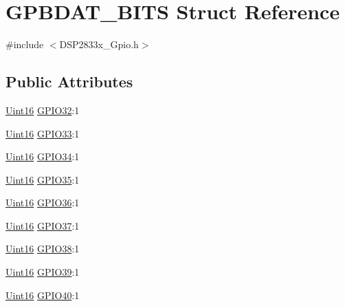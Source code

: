 \hypertarget{struct_g_p_b_d_a_t___b_i_t_s}{}\section{G\+P\+B\+D\+A\+T\+\_\+\+B\+I\+T\+S Struct Reference}
\label{struct_g_p_b_d_a_t___b_i_t_s}


{\ttfamily \#include $<$D\+S\+P2833x\+\_\+\+Gpio.\+h$>$}

\subsection*{Public Attributes}
\begin{DoxyCompactItemize}
\item 
\hyperlink{_d_s_p2833x___device_8h_a59a9f6be4562c327cbfb4f7e8e18f08b}{Uint16} \hyperlink{struct_g_p_b_d_a_t___b_i_t_s_a981125143e66de959da1abfd017fc312}{G\+P\+I\+O32}\+:1
\item 
\hyperlink{_d_s_p2833x___device_8h_a59a9f6be4562c327cbfb4f7e8e18f08b}{Uint16} \hyperlink{struct_g_p_b_d_a_t___b_i_t_s_a111131d857008ac74381f5df451e4d5e}{G\+P\+I\+O33}\+:1
\item 
\hyperlink{_d_s_p2833x___device_8h_a59a9f6be4562c327cbfb4f7e8e18f08b}{Uint16} \hyperlink{struct_g_p_b_d_a_t___b_i_t_s_ab83ff2fae58e99199de5c11d6d023df1}{G\+P\+I\+O34}\+:1
\item 
\hyperlink{_d_s_p2833x___device_8h_a59a9f6be4562c327cbfb4f7e8e18f08b}{Uint16} \hyperlink{struct_g_p_b_d_a_t___b_i_t_s_afb7dceb60d7307dc7c5b00c1e73caf30}{G\+P\+I\+O35}\+:1
\item 
\hyperlink{_d_s_p2833x___device_8h_a59a9f6be4562c327cbfb4f7e8e18f08b}{Uint16} \hyperlink{struct_g_p_b_d_a_t___b_i_t_s_aebb82f21e819b0e764b5ad19af88bd4a}{G\+P\+I\+O36}\+:1
\item 
\hyperlink{_d_s_p2833x___device_8h_a59a9f6be4562c327cbfb4f7e8e18f08b}{Uint16} \hyperlink{struct_g_p_b_d_a_t___b_i_t_s_aa1befdf28c641d439f64b45a02df65d8}{G\+P\+I\+O37}\+:1
\item 
\hyperlink{_d_s_p2833x___device_8h_a59a9f6be4562c327cbfb4f7e8e18f08b}{Uint16} \hyperlink{struct_g_p_b_d_a_t___b_i_t_s_a4e934b93cd175ac43d0ae09c51cff1e8}{G\+P\+I\+O38}\+:1
\item 
\hyperlink{_d_s_p2833x___device_8h_a59a9f6be4562c327cbfb4f7e8e18f08b}{Uint16} \hyperlink{struct_g_p_b_d_a_t___b_i_t_s_a76bbad5b5cf23725ce2968c9ffff75b6}{G\+P\+I\+O39}\+:1
\item 
\hyperlink{_d_s_p2833x___device_8h_a59a9f6be4562c327cbfb4f7e8e18f08b}{Uint16} \hyperlink{struct_g_p_b_d_a_t___b_i_t_s_a6fee46b1d1b1b1059150c887478515c5}{G\+P\+I\+O40}\+:1

\end{DoxyCompactItemize}
